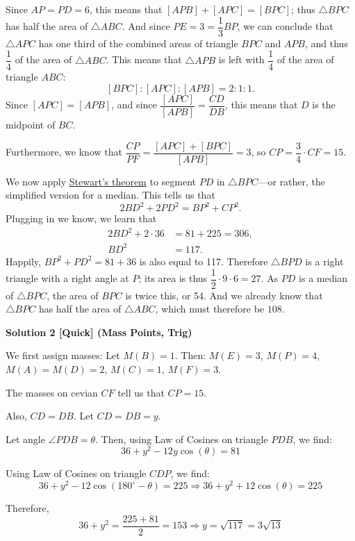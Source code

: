 \begin{enumerate}
 Since $AP = PD = 6$, this means that $[APB] + [APC] = [BPC]$; thus $\triangle BPC$ has half the area of $\triangle ABC$.  And since $PE = 3 = \dfrac{1}{3}BP$, we can conclude that $\triangle APC$ has one third of the combined areas of triangle $BPC$ and $APB$, and thus $\dfrac{1}{4}$ of the area of $\triangle ABC$.  This means that $\triangle APB$ is left with $\dfrac{1}{4}$ of the area of triangle $ABC$:
 \[[BPC]: [APC]: [APB] = 2:1:1.\]Since $[APC] = [APB]$, and since $\dfrac{[APC]}{[APB]} = \dfrac{CD}{DB}$, this means that $D$ is the midpoint of $BC$.

 Furthermore, we know that $\dfrac{CP}{PF} = \dfrac{[APC] + [BPC]}{[APB]} = 3$, so $CP = \dfrac{3}{4} \cdot CF = 15$.

 We now apply \href{https://artofproblemsolving.com/wiki/index.php?title=Stewart\%27s\_theorem}{Stewart's theorem} to segment $PD$ in $\triangle BPC$—or rather, the simplified version for a median.  This tells us that
 \[2 BD^2 + 2 PD^2 = BP^2+ CP^2.\] Plugging in we know, we learn that
 \begin{align*} 2 BD^2 + 2 \cdot 36 &= 81 + 225 = 306, \\ BD^2 &= 117. \end{align*}
Happily, $BP^2 + PD^2 = 81 + 36$ is also equal to 117.  Therefore $\triangle BPD$ is a right triangle with a right angle at $P$; its area is thus $\dfrac{1}{2} \cdot 9 \cdot 6 = 27$.  As $PD$ is a median of $\triangle BPC$, the area of $BPC$ is twice this, or 54.  And we already know that $\triangle BPC$ has half the area of $\triangle ABC$, which must therefore be $\boxed{108}$.

 



\textbf{Solution 2 [Quick] (Mass Points, Trig)}

We first assign masses:  Let $M(B) = 1$.  Then: $M(E) = 3$, $M(P) = 4$, $M(A) = M(D) = 2$, $M(C) = 1$, $M(F) = 3$.

 The masses on cevian $CF$ tell us that $CP = 15$.

 Also, $CD = DB$. Let $CD = DB = y$.

 Let angle $\angle PDB = \theta$.  Then, using Law of Cosines on triangle $PDB$, we find:
 \[36 + y^2 - 12y\cos(\theta) = 81\]

 Using Law of Cosines on triangle $CDP$, we find:
 \[36 + y^2 - 12\cos(180^\circ - \theta) = 225 \Rightarrow 36 + y^2 + 12\cos(\theta) = 225\]

 Therefore,
 \[36 + y^2 = \frac{225 + 81}{2} = 153 \Rightarrow y = \sqrt{117} = 3\sqrt{13}\]


\end{enumerate}
